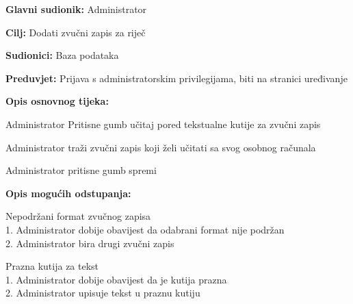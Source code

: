 					\noindent {}
					\begin{packed_item}
						\item \textbf{Glavni sudionik:} Administrator
						\item \textbf{Cilj:} Dodati zvučni zapis za riječ
						\item \textbf{Sudionici:} Baza podataka
						\item \textbf{Preduvjet:} Prijava s administratorskim privilegijama, biti na stranici uređivanje
						\item \textbf{Opis osnovnog tijeka:}
						\begin{packed_enum}
							\item Administrator Pritisne gumb učitaj pored tekstualne kutije za zvučni zapis
							\item Administrator traži zvučni zapis koji želi učitati sa svog osobnog računala
							\item Administrator pritisne gumb spremi
						\end{packed_enum}
						\item \textbf{Opis mogućih odstupanja:}
						\begin{packed_item}
							\item [2.a] Nepodržani format zvučnog zapisa
							\\1. Administrator dobije obavijest da odabrani format nije podržan
							\\2. Administrator bira drugi zvučni zapis
							\item [3.a] Prazna kutija za tekst
							\\1. Administrator dobije obavijest da je kutija prazna
							\\2. Administrator upisuje tekst u praznu kutiju
						\end{packed_item}
					\end{packed_item}
					
